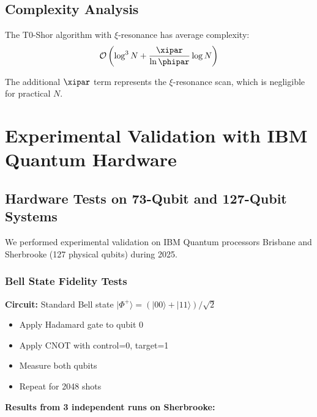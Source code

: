 \subsection{Complexity Analysis}

\begin{proposition}
	The T0-Shor algorithm with $\xi$-resonance has average complexity:
	\begin{equation}
		\mathcal{O}\left(\log^3 N + \frac{\xipar}{\ln \phipar} \log N\right)
	\end{equation}
\end{proposition}

The additional $\xipar$ term represents the $\xi$-resonance scan, which is negligible for practical $N$.

\section{Experimental Validation with IBM Quantum Hardware}
\label{sec:ibm_validation}

\subsection{Hardware Tests on 73-Qubit and 127-Qubit Systems}

We performed experimental validation on IBM Quantum processors Brisbane and Sherbrooke (127 physical qubits) during 2025.

\subsubsection{Bell State Fidelity Tests}

\begin{experimentbox}
	\textbf{Circuit:} Standard Bell state $|\Phi^+\rangle = (|00\rangle + |11\rangle)/\sqrt{2}$
	\begin{itemize}
		\item Apply Hadamard gate to qubit 0
		\item Apply CNOT with control=0, target=1
		\item Measure both qubits
		\item Repeat for 2048 shots
	\end{itemize}
\end{experimentbox}

\textbf{Results from 3 independent runs on Sherbrooke:}

